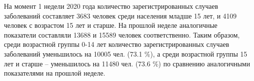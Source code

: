 На момент 1 недели 2020 года количество зарегистрированных случаев заболеваний составляет 3683 человек среди населения младше 15 лет, и 4109 человек с возрастом 15
лет и старше. На прошлой неделе аналогичные показатели составляли 13688 и 15589 человек соответственно. Таким образом, среди возрастной 
группы 0-14 лет количество зарегистрированных случаев заболеваний уменьшилось на 10005 чел. (73.1 \%), а среди возрастной группы 15 лет и старше -- уменьшилось на 11480 чел. (73.6 \%) 
по сравнению аналогичными показателями на прошлой неделе. 